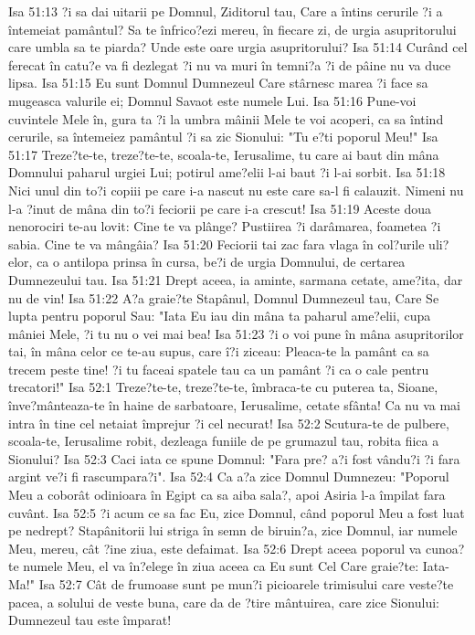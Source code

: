 Isa 51:13  ?i sa dai uitarii pe Domnul, Ziditorul tau, Care a întins cerurile ?i a întemeiat pamântul? Sa te înfrico?ezi mereu, în fiecare zi, de urgia asupritorului care umbla sa te piarda? Unde este oare urgia asupritorului?
Isa 51:14  Curând cel ferecat în catu?e va fi dezlegat ?i nu va muri în temni?a ?i de pâine nu va duce lipsa.
Isa 51:15  Eu sunt Domnul Dumnezeul Care stârnesc marea ?i face sa mugeasca valurile ei; Domnul Savaot este numele Lui.
Isa 51:16  Pune-voi cuvintele Mele în, gura ta ?i la umbra mâinii Mele te voi acoperi, ca sa întind cerurile, sa întemeiez pamântul ?i sa zic Sionului: "Tu e?ti poporul Meu!"
Isa 51:17  Treze?te-te, treze?te-te, scoala-te, Ierusalime, tu care ai baut din mâna Domnului paharul urgiei Lui; potirul ame?elii l-ai baut ?i l-ai sorbit.
Isa 51:18  Nici unul din to?i copiii pe care i-a nascut nu este care sa-l fi calauzit. Nimeni nu l-a ?inut de mâna din to?i feciorii pe care i-a crescut!
Isa 51:19  Aceste doua nenorociri te-au lovit: Cine te va plânge? Pustiirea ?i darâmarea, foametea ?i sabia. Cine te va mângâia?
Isa 51:20  Feciorii tai zac fara vlaga în col?urile uli?elor, ca o antilopa prinsa în cursa, be?i de urgia Domnului, de certarea Dumnezeului tau.
Isa 51:21  Drept aceea, ia aminte, sarmana cetate, ame?ita, dar nu de vin!
Isa 51:22  A?a graie?te Stapânul, Domnul Dumnezeul tau, Care Se lupta pentru poporul Sau: "Iata Eu iau din mâna ta paharul ame?elii, cupa mâniei Mele, ?i tu nu o vei mai bea!
Isa 51:23  ?i o voi pune în mâna asupritorilor tai, în mâna celor ce te-au supus, care î?i ziceau: Pleaca-te la pamânt ca sa trecem peste tine! ?i tu faceai spatele tau ca un pamânt ?i ca o cale pentru trecatori!"
Isa 52:1  Treze?te-te, treze?te-te, îmbraca-te cu puterea ta, Sioane, înve?mânteaza-te în haine de sarbatoare, Ierusalime, cetate sfânta! Ca nu va mai intra în tine cel netaiat împrejur ?i cel necurat!
Isa 52:2  Scutura-te de pulbere, scoala-te, Ierusalime robit, dezleaga funiile de pe grumazul tau, robita fiica a Sionului?
Isa 52:3  Caci iata ce spune Domnul: "Fara pre? a?i fost vându?i ?i fara argint ve?i fi rascumpara?i".
Isa 52:4  Ca a?a zice Domnul Dumnezeu: "Poporul Meu a coborât odinioara în Egipt ca sa aiba sala?, apoi Asiria l-a împilat fara cuvânt.
Isa 52:5  ?i acum ce sa fac Eu, zice Domnul, când poporul Meu a fost luat pe nedrept? Stapânitorii lui striga în semn de biruin?a, zice Domnul, iar numele Meu, mereu, cât ?ine ziua, este defaimat.
Isa 52:6  Drept aceea poporul va cunoa?te numele Meu, el va în?elege în ziua aceea ca Eu sunt Cel Care graie?te: Iata-Ma!"
Isa 52:7  Cât de frumoase sunt pe mun?i picioarele trimisului care veste?te pacea, a solului de veste buna, care da de ?tire mântuirea, care zice Sionului: Dumnezeul tau este împarat!

